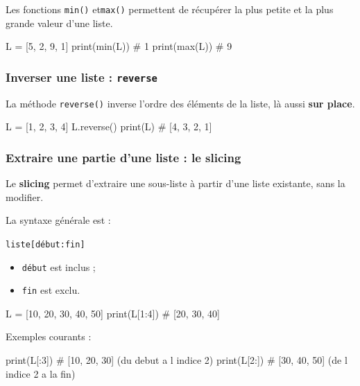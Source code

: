 \documentclass[11pt]{article}
\begin{document}
	Les fonctions \texttt{min()} et\texttt{max()} permettent
	de récupérer la plus petite et la plus grande valeur d’une liste.
	
	\begin{python}
	L = [5, 2, 9, 1]
	print(min(L))  # 1
	print(max(L))  # 9\end{python}
	
	\subsubsection*{Inverser une liste : \texttt{reverse}}
	
	La méthode \texttt{reverse()} inverse l’ordre des éléments de la liste,
	là aussi \textbf{sur place}.
	
	\begin{python}
	L = [1, 2, 3, 4]
	L.reverse()
	print(L)   # [4, 3, 2, 1]\end{python}
	
	\subsubsection*{Extraire une partie d’une liste : le slicing}
	
	Le \textbf{slicing} permet d’extraire une sous-liste à partir d’une liste existante,
	sans la modifier.
	
	La syntaxe générale est :
	
	\begin{center}
		\texttt{liste[début:fin]}
	\end{center}
	
	\begin{itemize}
		\item \texttt{début} est inclus ;
		\item \texttt{fin} est exclu.
	\end{itemize}
	
	\begin{python}
	L = [10, 20, 30, 40, 50]
	print(L[1:4])   # [20, 30, 40]\end{python}
	
	Exemples courants :
	
	\begin{python}
	print(L[:3])    # [10, 20, 30]  (du debut a l indice 2)
	print(L[2:])    # [30, 40, 50]  (de l indice 2 a la fin)\end{python}
	
	
\end{document}
